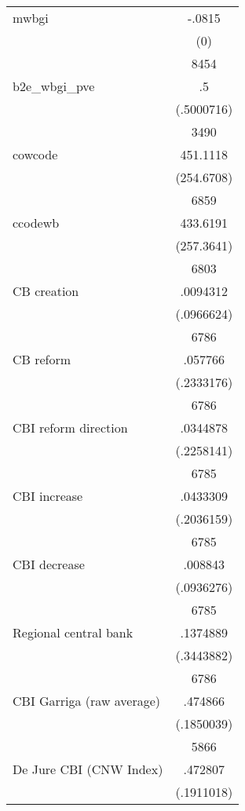 {\begin{longtable}{l*{1}{c}}
mwbgi               &      -.0815\\
                    &         (0)\\
                    &        8454\\
b2e\_wbgi\_pve        &          .5\\
                    &  (.5000716)\\
                    &        3490\\
cowcode             &    451.1118\\
                    &  (254.6708)\\
                    &        6859\\
ccodewb             &    433.6191\\
                    &  (257.3641)\\
                    &        6803\\
CB creation         &    .0094312\\
                    &  (.0966624)\\
                    &        6786\\
CB reform           &     .057766\\
                    &  (.2333176)\\
                    &        6786\\
CBI  reform direction&    .0344878\\
                    &  (.2258141)\\
                    &        6785\\
CBI increase        &    .0433309\\
                    &  (.2036159)\\
                    &        6785\\
CBI decrease        &     .008843\\
                    &  (.0936276)\\
                    &        6785\\
Regional central bank&    .1374889\\
                    &  (.3443882)\\
                    &        6786\\
CBI Garriga (raw average)&     .474866\\
                    &  (.1850039)\\
                    &        5866\\
De Jure CBI (CNW Index)&     .472807\\
                    &  (.1911018)\\

\end{longtable}}
